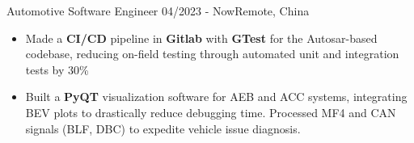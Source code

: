 \resumeSubheadingReza
{Automotive Software Engineer}{}
{04/2023 - Now}{Remote, China}
{
  
  \vspace{-12pt}
    \begin{itemize}
      \item {Made a \textbf{CI/CD} pipeline in \textbf{Gitlab} with \textbf{GTest} for the Autosar-based codebase, reducing on-field testing through automated unit and integration tests by 30\%}
      \item {Built a \textbf{PyQT} visualization software for AEB and ACC systems, integrating BEV plots to drastically reduce debugging time. Processed MF4 and CAN signals (BLF, DBC) to expedite vehicle issue diagnosis.}
  \end{itemize}
}